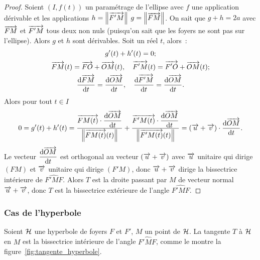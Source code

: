 \begin{proof}
  Soient \((I, f(t))\) un paramétrage de l'ellipse avec \(f\) une
  application dérivable et les applications \(h = \left\lVert\overrightarrow{F'M}\right\rVert\)
  \(g = \left\lVert\overrightarrow{FM}\right\rVert\). On sait que \(g + h = 2a\) avec \(\overrightarrow{FM}\) et
  \(\overrightarrow{F'M}\) tous deux non nuls (puisqu'on sait que les foyers ne
  sont pas sur l'ellipse). Alors \(g\) et \(h\) sont dérivables. Soit un
  réel \(t\), alors~:
  \begin{gather}
    g'(t) + h'(t) = 0; \\
    \overrightarrow{FM}(t) = \overrightarrow{FO} + \overrightarrow{OM}(t), \quad
    \overrightarrow{F'M}(t) = \overrightarrow{F'O} + \overrightarrow{OM}(t);\\
    \dfrac{\mathrm{d} \overrightarrow{FM}}{\mathrm{d} t} = \dfrac{\mathrm{d} \overrightarrow{OM}}{\mathrm{d} t}, \quad
    \dfrac{\mathrm{d} \overrightarrow{F'M}}{\mathrm{d} t} = \dfrac{\mathrm{d} \overrightarrow{OM}}{\mathrm{d} t}.
  \end{gather}
  Alors pour tout \(t \in I\)
  \begin{equation}
    0 = g'(t) + h'(t) =
    \frac{\overrightarrow{FM(t)}\cdot\dfrac{\mathrm{d} \overrightarrow{OM}}{\mathrm{d} t}}{\left\lVert\overrightarrow{FM(t)}(t)\right\rVert} +
    \frac{\overrightarrow{F'M(t)}\cdot\dfrac{\mathrm{d} \overrightarrow{OM}}{\mathrm{d} t}}{\left\lVert\overrightarrow{F'M(t)}(t)\right\rVert} =
    (\overrightarrow{u} + \overrightarrow{v})\cdot \dfrac{\mathrm{d} \overrightarrow{OM}}{\mathrm{d} t}.
  \end{equation}
  Le vecteur \(\dfrac{\mathrm{d} \overrightarrow{OM}}{\mathrm{d} t}\) est orthogonal au vecteur
  \((\overrightarrow{u} + \overrightarrow{v})\) avec \(\overrightarrow{u}\) unitaire qui dirige \((FM)\)
  et \(\overrightarrow{v}\) unitaire qui dirige \((F'M)\), donc
  \(\overrightarrow{u} + \overrightarrow{v}\) dirige la bissectrice intérieure de
  \(\widehat{F'MF}\). Alors \(T\) est la droite passant par \(M\) de
  vecteur normal \(\overrightarrow{u} + \overrightarrow{v}\), donc \(T\) est la bissectrice
  extérieure de l'angle \(\widehat{F'MF}\).
\end{proof}

\subsubsection{Cas de l'hyperbole}

\begin{prop}
  Soient \(\mathcal{H}\) une hyperbole de foyers \(F\) et \(F'\), \(M\) un point
  de \(\mathcal{H}\). La tangente \(T\) à \(\mathcal{H}\) en \(M\) est la bissectrice
  intérieure de l'angle \(\widehat{F'MF}\), comme le montre la
  figure~\ref{fig:tangente_hyperbole}.
\end{prop}

